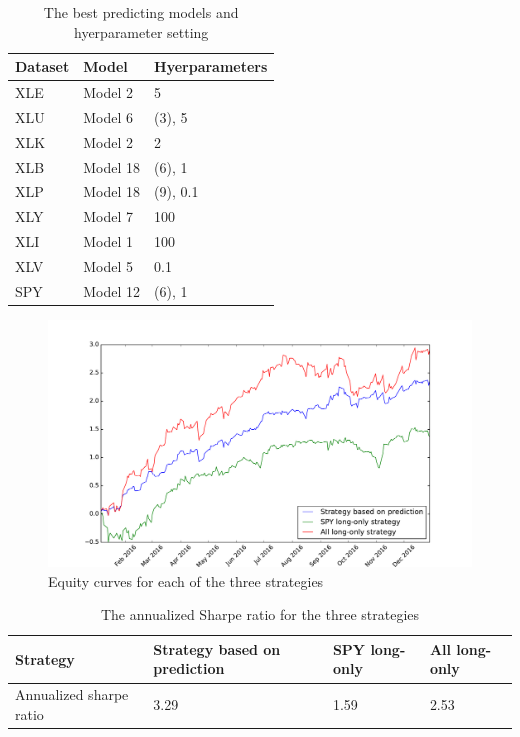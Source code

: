 \documentclass[letterpaper]{article}
\begin{document}
\begin{table}
  \centering
  \caption{The best predicting models and hyerparameter setting}
  \label{models}
  \begin{tabular}{lll}
    \hline
    Dataset     & Model             & Hyerparameters \\
    \hline
    XLE         & Model 2           & 5              \\
    XLU         & Model 6           & (3), 5         \\
    XLK         & Model 2           & 2              \\
    XLB         & Model 18          & (6), 1         \\
    XLP         & Model 18          & (9), 0.1       \\
    XLY         & Model 7           & 100            \\
    XLI         & Model 1           & 100            \\
    XLV         & Model 5           & 0.1            \\
    SPY         & Model 12          & (6), 1         \\
    \hline
  \end{tabular}
\end{table}

\begin{figure}
  \centering
      \includegraphics[width=6in]{Images/equity.pdf}
      \caption{Equity curves for each of the three strategies}
      \label{equity}
\end{figure}


\begin{table}
  \centering
  \caption{The annualized Sharpe ratio for the three strategies}
  \label{sharpe}
  \begin{tabular}{llll}
    \hline
    Strategy & Strategy based on prediction & SPY long-only & All long-only \\
    \hline
    Annualized sharpe ratio & 3.29 & 1.59 & 2.53 \\
    \hline
  \end{tabular}
\end{table}
\end{document}
